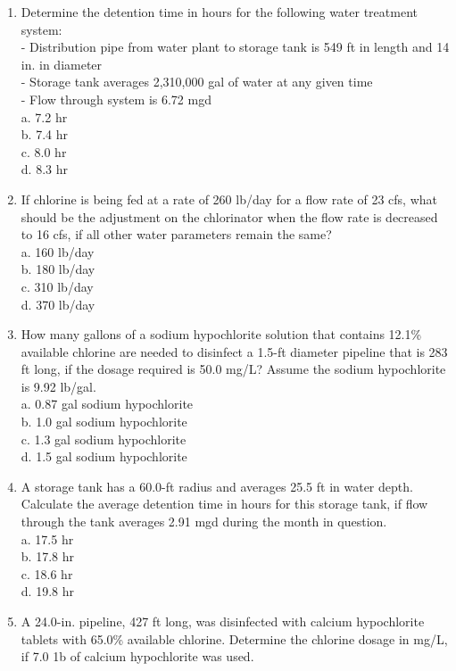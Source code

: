 \begin{enumerate}
\item Determine the detention time in hours for the following water treatment system:\\
-	Distribution pipe from water plant to storage tank is 549 ft in length and 14 in. in diameter\\
-	Storage tank averages 2,310,000 gal of water at any given time\\
-	Flow through system is 6.72 mgd\\
a.	7.2 hr\\
b.	7.4 hr\\
c.	8.0 hr\\
d.	8.3 hr\\
\item If chlorine is being fed at a rate of 260 lb/day for a flow rate of 23 cfs, what should be the adjustment on the chlorinator when the flow rate is decreased to 16 cfs, if all other water parameters remain the same?\\
a.	160 lb/day\\
b.	180 lb/day\\
c.	310 lb/day\\
d.	370 lb/day\\
\item How many gallons of a sodium hypochlorite solution that contains 12.1\% available chlorine are needed to disinfect a 1.5-ft diameter pipeline that is 283 ft long, if the dosage required is 50.0 mg/L? Assume the sodium hypochlorite is 9.92 lb/gal.\\
a.	0.87 gal sodium hypochlorite\\
b.	1.0 gal sodium hypochlorite\\
c.	1.3 gal sodium hypochlorite\\
d.	1.5 gal sodium hypochlorite\\
\item A storage tank has a 60.0-ft radius and averages 25.5 ft in water depth. Calculate the average detention time in hours for this storage tank, if flow through the tank averages 2.91 mgd during the month in question.\\
a.	17.5 hr\\
b.	17.8 hr\\
c.	18.6 hr\\
d.	19.8 hr\\
\item A 24.0-in. pipeline, 427 ft long, was disinfected with calcium hypochlorite tablets with 65.0\% available chlorine. Determine the chlorine dosage in mg/L, if 7.0 1b of calcium hypochlorite was used.\\

\end{enumerate}
